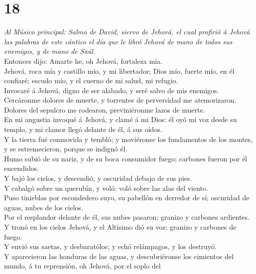 \hypertarget{section-17}{%
\section{18}\label{section-17}}

 \emph{Al Músico principal: Salmo de David, siervo de
Jehová, el cual profirió á Jehová las palabras de este cántico el día
que le libró Jehová de mano de todos sus enemigos, y de mano de Saúl.}\\
Entonces dijo: Amarte he, oh Jehová, fortaleza mía.\\
 Jehová, roca mía y castillo mío, y mi libertador; Dios mío,
fuerte mío, en él confiaré; escudo mío, y el cuerno de mi salud, mi
refugio.\\
 Invocaré á Jehová, digno de ser alabado, y seré salvo de
mis enemigos.\\
 Cercáronme dolores de muerte, y torrentes de perversidad me
atemorizaron.\\
 Dolores del sepulcro me rodearon, previniéronme lazos de
muerte.\\
 En mi angustia invoqué á Jehová, y clamé á mi Dios: él oyó
mi voz desde su templo, y mi clamor llegó delante de él, á sus oídos.\\
 Y la tierra fué conmovida y tembló; y moviéronse los
fundamentos de los montes, y se estremecieron, porque se indignó él.\\
 Humo subió de su nariz, y de su boca consumidor fuego;
carbones fueron por él encendidos.\\
 Y bajó los cielos, y descendió; y oscuridad debajo de sus
pies.\\
 Y cabalgó sobre un querubín, y voló: voló sobre las alas
del viento.\\
 Puso tinieblas por escondedero suyo, su pabellón en
derredor de sí; oscuridad de aguas, nubes de los cielos.\\
 Por el resplandor delante de él, sus nubes pasaron;
granizo y carbones ardientes.\\
 Y tronó en los cielos Jehová, y el Altísimo dió su voz;
granizo y carbones de fuego.\\
 Y envió sus saetas, y desbaratólos; y echó relámpagos, y
los destruyó.\\
 Y aparecieron las honduras de las aguas, y descubriéronse
los cimientos del mundo, á tu reprensión, oh Jehová, por el soplo del
